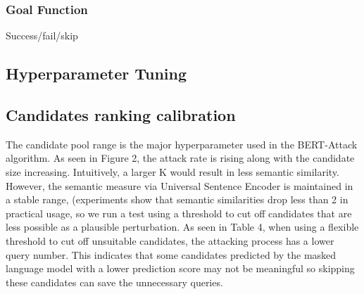 
\subsubsection{Goal Function}\label{subsubsec:goal-function}
Success/fail/skip


\subsection{Hyperparameter Tuning}\label{subsec:hyperparameter-tuning}


\subsection{Candidates ranking calibration}\label{subsec:candidates-ranking-calibration}
The candidate pool range is the major hyperparameter used in the BERT-Attack algorithm. As seen in Figure 2, the attack rate is rising along with the candidate size increasing. Intuitively, a larger 
K would result in less semantic similarity. However, the semantic measure via Universal Sentence Encoder is maintained in a stable range, (experiments show that semantic similarities drop less than 2%
in practical usage, so we run a test using a threshold to cut off candidates that are less possible as a plausible perturbation. As seen in Table 4, when using a flexible threshold to cut off unsuitable candidates, the attacking process has a lower query number. This indicates that some candidates predicted by the masked language model with a lower prediction score may not be meaningful so skipping these candidates can save the unnecessary queries.
